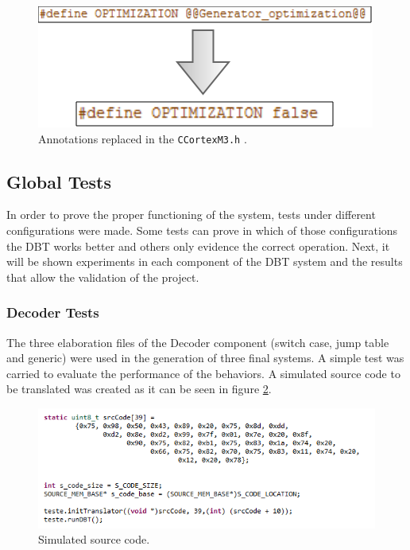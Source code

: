 \begin{figure}[H]
	\centerline{
		\includegraphics[scale=0.5]{images/optAnn}
	}
	\caption{Annotations replaced in the \texttt{CCortexM3.h} .}
	\label{fig:annotation_test4}
\end{figure}



\subsection{Global Tests}

In order to prove the proper functioning of the system, tests under different configurations were made. Some tests can prove in which of those configurations the DBT works better and others only evidence the correct operation. 
Next, it will be shown experiments in each component of the DBT system and the results that allow the validation of the project.

\subsubsection{Decoder Tests}
The three elaboration files of the Decoder component (switch case, jump table and generic) were used in the generation of three final systems. A simple test was carried to evaluate the performance of the behaviors. A simulated source code to be translated was created as it can be seen in figure \ref{fig:SourceCodeDecoderTest}.

\begin{figure}[H]
\centerline{
\includegraphics[scale=0.65]{images/sourceCode.png}
}
\caption{Simulated source code.}
\label{fig:SourceCodeDecoderTest}
\end{figure}

